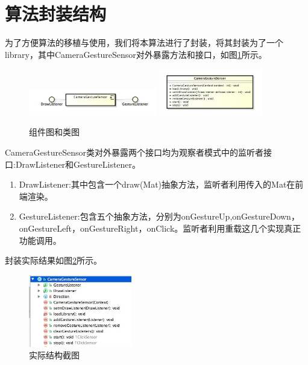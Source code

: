\documentclass{XDBAthesis}
\begin{document}
\section{算法封装结构}
为了方便算法的移植与使用，我们将本算法进行了封装，将其封装为了一个library，其中CameraGestureSensor对外暴露方法和接口，如图\ref{fg:cmp}所示。
\begin{figure}[htb]
    \centering
    \includegraphics[width=0.5\textwidth ]{figure/cmp}%
    \includegraphics[width=0.4\textwidth ]{figure/pkg}
    \caption{组件图和类图}
    \label{fg:cmp}
\end{figure}
CameraGestureSensor类对外暴露两个接口均为观察者模式中的监听者接口:DrawListener和GestureListener。
\begin{enumerate}
    \item DrawListener:其中包含一个draw(Mat)抽象方法，监听者利用传入的Mat在前端渲染。
    \item GestureListener:包含五个抽象方法，分别为onGestureUp,onGestureDown，onGestureLeft，onGestureRight，onClick。监听者利用重载这几个实现真正功能调用。
\end{enumerate}
封装实际结果如图\ref{fg:rr}所示。
\begin{figure}[htb]
    \centering
    \includegraphics[width=0.4\textwidth ]{figure/realpkg}
    \caption{实际结构截图}
    \label{fg:rr}
\end{figure}

\ifx\allfiles\undefined
%

\end{document}
